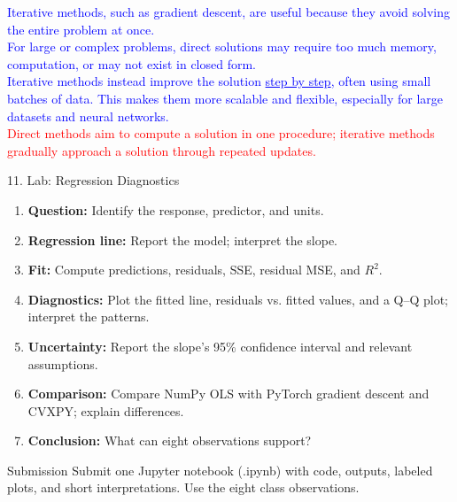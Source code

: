 \documentclass[aspectratio=43,11pt]{beamer}
\begin{document}
\begin{frame}
\textcolor{blue}{
Iterative methods, such as gradient descent, are useful because they avoid solving the entire problem at once.\\[6pt]
For large or complex problems, direct solutions may require too much memory, computation, or may not exist in closed form.\\[6pt]
Iterative methods instead improve the solution \ul{step by step}, often using small batches of data. This makes them more scalable and flexible, especially for large datasets and neural networks.\\[6pt]}
\textcolor{red}{
Direct methods aim to compute a solution in one procedure; iterative methods gradually approach a solution through repeated updates.
}
\end{frame}

\begin{frame}{11. Lab: Regression Diagnostics}
\footnotesize
\begin{enumerate}
\setlength{\itemsep}{3pt}
\item \textbf{Question:} Identify the response, predictor, and units.
\item \textbf{Regression line:} Report the model; interpret the slope. %
\item \textbf{Fit:} Compute predictions, residuals, SSE, residual MSE, and $R^2$.
\item \textbf{Diagnostics:} Plot the fitted line, residuals vs. fitted values, and a Q--Q plot; interpret the patterns.
\item \textbf{Uncertainty:} Report the slope's 95\% confidence interval and relevant assumptions.
\item \textbf{Comparison:} Compare NumPy OLS with PyTorch gradient descent and CVXPY; explain differences.
\item \textbf{Conclusion:} What can eight observations support?
\end{enumerate}
\begin{block}{Submission}
Submit one Jupyter notebook (.ipynb) with code, outputs, labeled plots, and short interpretations. Use the eight class observations.
\end{block}
\end{frame}
\end{document}
